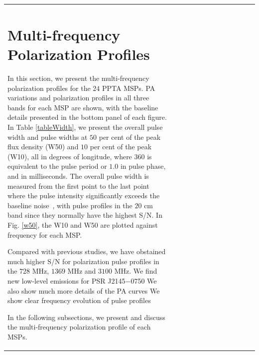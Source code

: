 \documentclass[useAMS,usenatbib]{mn2e}
\begin{document}
\begin{table}
\begin{center}
\begin{tabular}{lcccccccccccc}
\section{Multi-frequency Polarization Profiles}

In this section, we present the multi-frequency polarization profiles for 
the $24$ PPTA MSPs. 
%
PA variations and polarization profiles in all three bands for each MSP 
are shown, with the baseline details presented in the bottom panel of each 
figure.
%
In Table \ref{tableWidth}, we present the overall pulse width and pulse 
widths at $50$ per cent of the peak flux density (W50) and $10$ per cent 
of the peak (W10), all in degrees of longitude, where $360$ is equivalent 
to the pulse period or $1.0$ in pulse phase, and in milliseconds.
%
The overall pulse width is measured from the first point to the last point 
where the pulse intensity significantly exceeds the baseline 
noise~\citet{Yan11}, with pulse profiles in the $20$ cm band since they 
normally have the highest S/N.
%
%
%
In Fig. \ref{w50}, the W10 and W50 are plotted against frequency for each MSP. 
%

Compared with previous studies, we have obstained much higher S/N for 
polarization pulse profiles in the $728$ MHz, $1369$ MHz and $3100$ MHz. 
%
We find new low-level emissions for PSR J2145$-$0750
%
We also show much more details of the PA curves
%
We show clear frequency evolution of pulse profiles


In the following subsections, we present and discuss the multi-frequency 
polarization profile of each MSPs.
%


\end{tabular}
\end{center}
\end{table}
\end{document}
